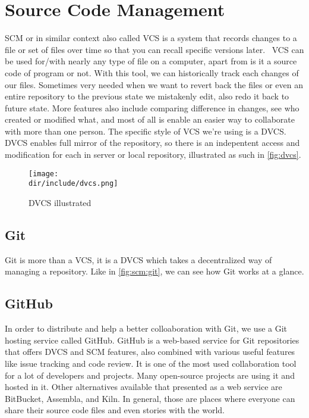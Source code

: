 \section{Source Code Management}
\label{sec:scm}

\ac{SCM} or in similar context also called \ac{VCS} is a system that records changes to a file or set of files over time so that you can recall specific versions later.~\autocite{Chacon:2014:ProGit:27}
\ac{VCS} can be used for/with nearly any type of file on a computer, apart from is it a source code of program or not.
With this tool, we can historically track each changes of our files.
Sometimes very needed when we want to revert back the files or even an entire repository to the previous state we mistakenly edit, also redo it back to future state.
More features also include comparing difference in changes, see who created or modified what, and most of all is enable an easier way to collaborate with more than one person.
The specific style of \ac{VCS} we're using is a \ac{DVCS}.
\ac{DVCS} enables full mirror of the repository, so there is an indepentent access and modification for each in server or local repository, illustrated as such in \autoref{fig:dvcs}.

\begin{figure}[htb]
    \centering
    \texttt{[image: \\dir/include/dvcs.png]}
    \caption[DVCS illustrated]{DVCS illustrated}
    \label{fig:dvcs}
\end{figure}

\subsection{Git}

Git is more than a \ac{VCS}, it is a \ac{DVCS} which takes a decentralized way of managing a repository.
Like in \autoref{fig:scm:git}, we can see how Git works at a glance.

\begin{figure}[htb]
    \centering
    \label{fig:git}
\end{figure}

\subsection{GitHub}

In order to distribute and help a better colloaboration with Git, we use a Git hosting service called GitHub.
GitHub is a web-based service for Git repositories that offers \ac{DVCS} and \ac{SCM} features, also combined with various useful features like issue tracking and code review.
It is one of the most used collaboration tool for a lot of developers and projects.
Many open-source projects are using it and hosted in it.
Other alternatives available that presented as a web service are BitBucket, Assembla, and Kiln.
In general, those are places where everyone can share their source code files and even stories with the world.
